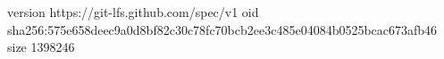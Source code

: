version https://git-lfs.github.com/spec/v1
oid sha256:575e658deec9a0d8bf82c30c78fc70bcb2ee3c485e04084b0525bcac673afb46
size 1398246
